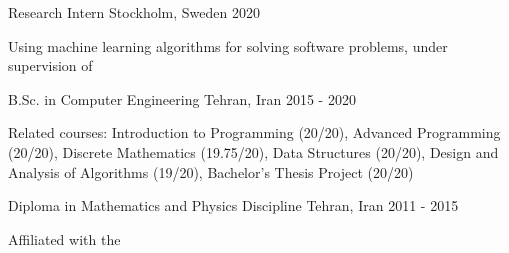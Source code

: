 

\begin{cventries}

  \cventry
    {Research Intern} %
    {} %
    {Stockholm, Sweden} %
    {2020} %
    {
      \begin{cvitems} %
        \item {Using machine learning algorithms for solving software problems, under supervision of }
      \end{cvitems}
    }

  \cventry
    {B.Sc. in Computer Engineering} %
    {} %
    {Tehran, Iran} %
    {2015 - 2020} %
    {
      \begin{cvitems} %
        \item {Related courses: Introduction to Programming (20/20), Advanced Programming (20/20), Discrete Mathematics (19.75/20), Data Structures (20/20), Design and Analysis of Algorithms (19/20), Bachelor's Thesis Project (20/20)}
      \end{cvitems}
    }

  \cventry
    {Diploma in Mathematics and Physics Discipline} %
    {} %
    {Tehran, Iran} %
    {2011 - 2015} %
    {
      \begin{cvitems} %
        \item {Affiliated with the }
      \end{cvitems}
    }

\end{cventries}
